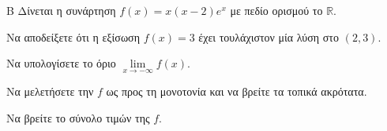\begin{thema}{Β}
Δίνεται η συνάρτηση $f(x) = x(x-2)e^x$ με πεδίο ορισμού το $\mathbb{R}$.
\begin{erwthma}
\item Να αποδείξετε ότι η εξίσωση $f(x) = 3$ έχει τουλάχιστον μία λύση στο $(2, 3)$.
\item Να υπολογίσετε το όριο $\lim\limits_{x \to -\infty} f(x)$.
\item Να μελετήσετε την $f$ ως προς τη μονοτονία και να βρείτε τα τοπικά ακρότατα.
\item Να βρείτε το σύνολο τιμών της $f$.
\end{erwthma}
\end{thema}
